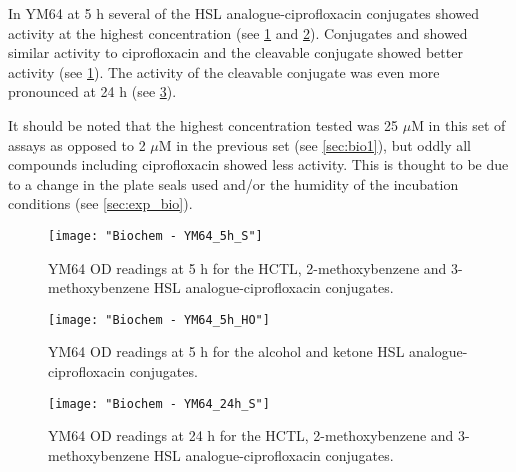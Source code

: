 
In YM64 at 5 h several of the HSL analogue-ciprofloxacin conjugates showed activity at the highest concentration (see \ref{fgr:YM64_5h_S} and \ref{fgr:YM64_5h_HO}). 
Conjugates  and  showed similar activity to ciprofloxacin  and the cleavable conjugate
 showed better activity (see \ref{fgr:YM64_5h_S}).
The activity of the cleavable conjugate  was even more pronounced at 24 h (see \ref{fgr:YM64_24h_S}).

It should be noted that the highest concentration tested was 25 $\mu$M in this set of assays as opposed to 2 $\mu$M in the previous set (see \ref{sec:bio1}), but oddly all compounds including ciprofloxacin  showed less activity. This is thought to be due to a change in the plate seals used and/or the humidity of the incubation conditions (see \ref{sec:exp_bio}). 


\begin{figure}[H]
	\begin{center}
		\texttt{[image: "Biochem - YM64\_5h\_S"]}
		\caption{YM64 OD readings at 5 h for the HCTL, 2-methoxybenzene and 3-methoxybenzene HSL analogue-ciprofloxacin conjugates.\label{fgr:YM64_5h_S}}
	\end{center}
\end{figure}

\begin{figure}[H]
	\begin{center}
		\texttt{[image: "Biochem - YM64\_5h\_HO"]}
		\caption{YM64 OD readings at 5 h for the alcohol and ketone HSL analogue-ciprofloxacin conjugates.\label{fgr:YM64_5h_HO}}
	\end{center}
\end{figure}

\begin{figure}[H]
	\begin{center}
		\texttt{[image: "Biochem - YM64\_24h\_S"]}
		\caption{YM64 OD readings at 24 h for the HCTL, 2-methoxybenzene and 3-methoxybenzene HSL analogue-ciprofloxacin conjugates.\label{fgr:YM64_24h_S}}
	\end{center}
\end{figure}


